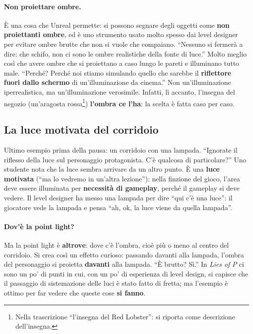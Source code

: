 \paragraph{Non proiettare ombre.} È una cosa che Unreal permette: si possono segnare
degli oggetti come \textbf{non proiettanti ombre}, ed è uno strumento usato molto
spesso dai level designer per evitare ombre brutte che non si vuole che compaiano.
``Nessuno si fermerà a dire: che schifo, non ci sono le ombre realistiche della
fonte di luce.'' Molto meglio così che avere ombre che si proiettano a caso lungo
le pareti e illuminano tutto male. ``Perché? Perché noi stiamo simulando quello
che sarebbe il \textbf{riflettore fuori dallo schermo} di un'illuminazione da
cinema.'' Non un'illuminazione iperrealistica, ma un'illuminazione verosimile.
Infatti, lì accanto, l'insegna del negozio (un'aragosta rossa\footnote{Nella
trascrizione ``l'insegna del Red Lobster'': si riporta come descrizione
dell'insegna.}) \textbf{l'ombra ce l'ha}: la scelta è fatta caso per caso.

\subsection{La luce motivata del corridoio}

Ultimo esempio prima della pausa: un corridoio con una lampada. ``Ignorate il
riflesso della luce sul personaggio protagonista. C'è qualcosa di particolare?''
Uno studente nota che la luce sembra arrivare da un altro punto. È una \textbf{luce
motivata} (``ma lo vedremo in un'altra lezione''): nella finzione del gioco, l'area
deve essere illuminata per \textbf{necessità di gameplay}, perché il gameplay si deve
vedere. Il level designer ha messo una lampada per dire ``qui c'è una luce'': il
giocatore vede la lampada e pensa ``ah, ok, la luce viene da quella lampada''.

\paragraph{Dov'è la point light?} Ma la point light è \textbf{altrove}: dove c'è
l'ombra, cioè più o meno al centro del corridoio. Si crea così un effetto curioso:
passando davanti alla lampada, l'ombra del personaggio si proietta \textbf{davanti}
alla lampada. ``È brutto? Sì.'' In \emph{Lies of P} ci sono un po' di punti in cui,
con un po' di esperienza di level design, si capisce che il passaggio di
sistemazione delle luci è stato fatto di fretta; ma l'esempio è ottimo per far
vedere che queste cose \textbf{si fanno}.

